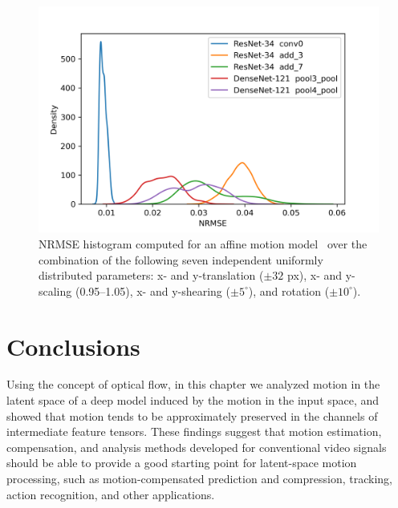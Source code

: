 \begin{figure}[htbp]
    \centering
    \includegraphics[width=\linewidth]{img/video_latent_space_motion_analysis/nrmse/random.png}
    \caption{%
        NRMSE histogram computed for an affine motion model~\cite{wang_etal_2002} over the combination of the following seven independent uniformly distributed parameters: x- and y-translation ($\pm 32$ px), x- and y-scaling (0.95--1.05), x- and y-shearing ($\pm 5^{\circ}$), and rotation ($\pm 10^{\circ}$).%
    }
    \label{fig:video_latent_space_motion_analysis/mse/histogram}
\end{figure}




\section{Conclusions}
\label{sec:video_latent_space_motion_analysis/conclusions}
Using the concept of optical flow, in this chapter we analyzed motion in the latent space of a deep model induced by the motion in the input space, and showed that motion tends to be approximately preserved in the channels of intermediate feature tensors. These findings suggest that motion estimation, compensation, and analysis methods developed for conventional video signals should be able to provide a good starting point for latent-space motion processing, such as motion-compensated prediction and compression, tracking, action recognition, and other applications.

